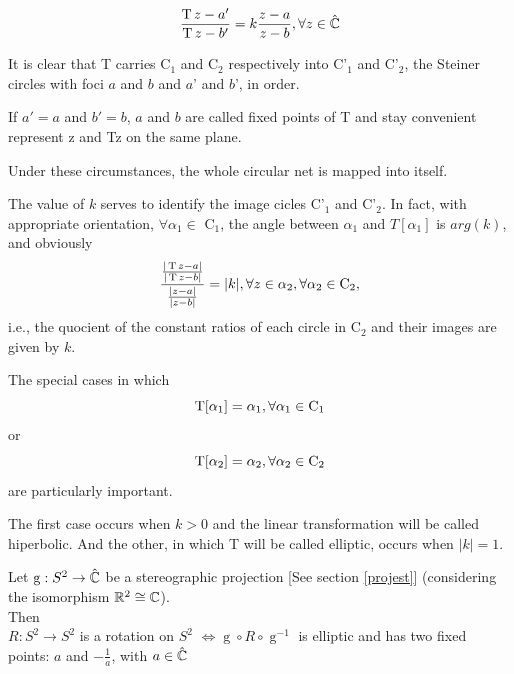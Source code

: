 \begin{gather*}
    \frac{\operatorname{T}z-a'}{\operatorname{T}z-b'} = k \frac{z-a}{z-b}, \forall z \in \hat{\mathbb{C}}
\end{gather*}

It is clear that T carries C$_1$ and C$_2$ respectively into C'$_1$ and C'$_2$, the Steiner circles with foci $a$ and $b$ and $a$' and $b$', in order.

If $a' = a$ and $b' = b$, $a$ and $b$ are called fixed points of T and stay convenient represent z and Tz on the same plane.

Under these circumstances, the whole circular net is mapped into itself.

The value of $k$ serves to identify the image cicles C'$_1$ and C'$_2$. In fact, with appropriate orientation, $\forall \alpha_1 \in$ C$_1$, the angle between $\alpha_1$ and $T[\alpha_1]$ is $arg(k)$, and obviously
\begin{equation*}
    \frac{\frac{|\operatorname{T}z-a|}{|\operatorname{T}z-b|}}{\frac{|z-a|}{|z-b|}} = |k|, \forall z \in \alpha_2, \forall \alpha_2 \in \operatorname{C}_2,
\end{equation*}
i.e., the quocient of the constant ratios of each circle in C$_2$ and their images are given by $k$.

The special cases in which 
\begin{equation*}
    \operatorname{T}[\alpha_1]=\alpha_1, \forall \alpha_1 \in \operatorname{C}_1
\end{equation*}
or
\begin{equation*}
\operatorname{T}[\alpha_2]=\alpha_2, \forall \alpha_2 \in \operatorname{C}_2    
\end{equation*}
are particularly important.

The first case occurs when $k>0$ and the linear transformation will be called hiperbolic. And the other, in which T will be called elliptic, occurs when $|k|=1$.

\begin{proposicao}
Let $\operatorname{g} : S^2 \rightarrow \hat{\mathbb{C}}$ be a stereographic projection [See section \ref{projest}] (considering the isomorphism $\mathbb{R}^2 \cong \mathbb{C}$).\\
Then \\
$R : S^2 \rightarrow S^2$ is a rotation on $S^2$ $\Leftrightarrow \operatorname{g} \circ R \circ \operatorname{g}^{-1}$ is elliptic and has two fixed points: $a$ and $-\frac{1}{a}$, with $a \in \hat{\mathbb{C}}$
\end{proposicao}

